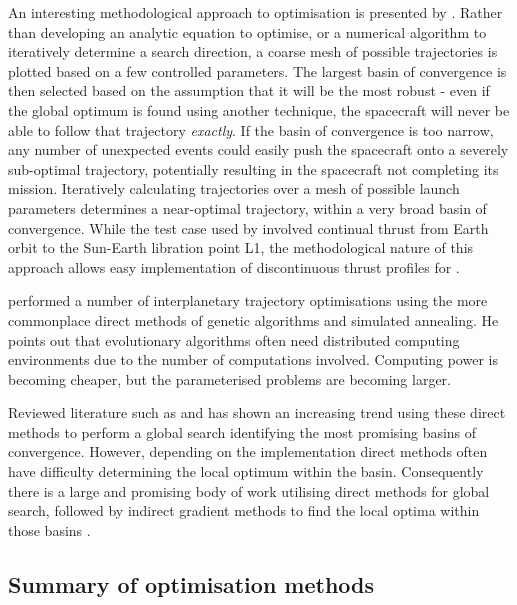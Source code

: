 An interesting methodological approach to optimisation is presented by \textcite{Jackson2008}. Rather than developing an analytic equation to optimise, or a numerical algorithm to iteratively determine a search direction, a coarse mesh of possible trajectories is plotted based on a few controlled parameters. The largest basin of convergence is then selected based on the assumption that it will be the most robust - even if the global optimum is found using another technique, the spacecraft will never be able to follow that trajectory \emph{exactly}. If the basin of convergence is too narrow, any number of unexpected events could easily push the spacecraft onto a severely sub-optimal trajectory, potentially resulting in the spacecraft not completing its mission. Iteratively calculating trajectories over a mesh of possible launch parameters determines a near-optimal trajectory, within a very broad basin of convergence. While the test case used by \textcite{Jackson2008} involved continual thrust from Earth orbit to the Sun-Earth libration point L1, the methodological nature of this approach allows easy implementation of discontinuous thrust profiles for \BW.%

\textcite{Lee2005} performed a number of interplanetary trajectory optimisations using the more commonplace direct methods of genetic algorithms and simulated annealing. He points out that evolutionary algorithms often need distributed computing environments due to the number of computations involved. Computing power is becoming cheaper, but the parameterised problems are becoming larger. 

Reviewed literature such as \textcite{Dachwald2005} and \textcite{Jackson2008} has shown an increasing trend using these direct methods to perform a global search identifying the most promising basins of convergence. However, depending on the implementation direct methods often have difficulty determining the local optimum within the basin. 
Consequently there is a large and promising body of work utilising direct methods for global search, followed by indirect gradient methods to find the local optima within those basins \parencite{Stryck1992, Kluever1995, Vasile2009, Yam2011}.

\subsection{Summary of optimisation methods}

